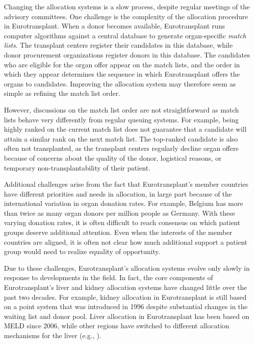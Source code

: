 \documentclass[11pt,twoside,]{book}
\begin{document}
Changing the allocation systems is a slow process, despite regular meetings
of the advisory committees. One challenge is the complexity of the allocation procedure in
Eurotransplant. When a donor becomes available, Eurotransplant runs computer
algorithms against a central database to generate organ-specific \emph{match lists}.
The transplant centers register their candidates in this database, while
donor procurement organizations register donors in this database. The candidates who are
eligible for the organ offer appear on the match lists, and the order
in which they appear determines the sequence in which Eurotransplant
offers the organs to candidates. Improving the
allocation system may therefore seem as simple as refining the match list order.

However, discussions on the match list order are not straightforward as
match lists behave very differently from regular queuing systems. For example,
being highly ranked on the current match list does not guarantee that a
candidate will attain a similar rank on the next match list.
The top-ranked candidate is also often not transplanted, as the transplant
centers regularly decline organ offers because of concerns about the quality
of the donor, logistical reasons, or temporary non-transplantability of their
patient.

Additional challenges arise from the fact that Eurotransplant's member countries
have different priorities and needs in allocation, in large part because of
the international variation in organ donation rates. For example, Belgium has
more than twice as many organ donors per million people as Germany.
With these varying donation rates, it is often difficult to reach consensus on which
patient groups deserve additional attention. Even when the interests of the
member countries are aligned, it is often not clear how much additional
support a patient group would need to realize equality of opportunity.

Due to these challenges, Eurotransplant's allocation systems evolve only slowly in
response to developments in the field. In fact, the core components of Eurotransplant's
liver and kidney allocation systems have changed little over the past two
decades. For example, kidney allocation in Eurotransplant is still based on
a point system that was introduced in 1996 despite substantial changes in
the waiting list and donor pool. Liver allocation in Eurotransplant has been
based on MELD since 2006, while other regions have switched to different
allocation mechanisms for the liver (e.g., \citep{Allen2024, kimMELD3point0}).
\end{document}
